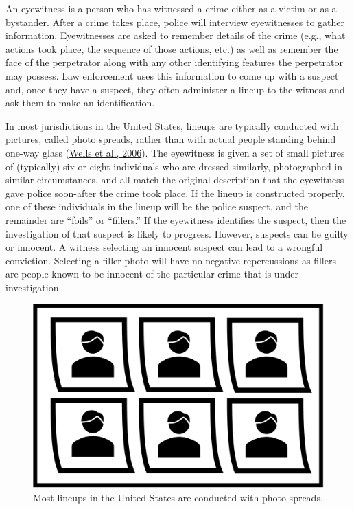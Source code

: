 \documentclass[
]{krantz}
\begin{document}
An eyewitness is a person who has witnessed a crime either as a victim or as a bystander. After a crime takes place, police will interview eyewitnesses to gather information. Eyewitnesses are asked to remember details of the crime (e.g., what actions took place, the sequence of those actions, etc.) as well as remember the face of the perpetrator along with any other identifying features the perpetrator may possess. Law enforcement uses this information to come up with a suspect and, once they have a suspect, they often administer a lineup to the witness and ask them to make an identification.

In most jurisdictions in the United States, lineups are typically conducted with pictures, called photo spreads, rather than with actual people standing behind one-way glass (\protect\hyperlink{ref-wells2006eyewitness}{Wells et al., 2006}). The eyewitness is given a set of small pictures of (typically) six or eight individuals who are dressed similarly, photographed in similar circumstances, and all match the original description that the eyewitness gave police soon-after the crime took place. If the lineup is constructed properly, one of these individuals in the lineup will be the police suspect, and the remainder are ``foils'' or ``fillers.'' If the eyewitness identifies the suspect, then the investigation of that suspect is likely to progress. However, suspects can be guilty or innocent. A witness selecting an innocent suspect can lead to a wrongful conviction. Selecting a filler photo will have no negative repercussions as fillers are people known to be innocent of the particular crime that is under investigation.

\begin{figure}

{\centering \includegraphics[width=0.6\linewidth]{images/ch6/lineup} 

}

\caption{Most lineups in the United States are conducted with photo spreads.}\label{fig:lineup}
\end{figure}
\end{document}
